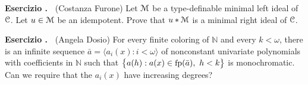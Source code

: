 \documentclass[10pt]{article}
\def\M{\EuScript M}
\def\C{\EuScript C}
\def\NN{\mathds N}
\newcounter{ex}
\newenvironment{exercise}{\bigskip\addtocounter{ex}{1}\textbf{Esercizio \theex.\ }}{}
\begin{document}
\begin{exercise} 
  (Costanza Furone)
  Let $\M$ be a type-definable minimal left ideal of $\C$.
  Let $u\in\M$ be an idempotent.
  Prove that $u*\M$ is a minimal right ideal of $\C$.
\end{exercise}

\begin{exercise}
  (Angela Dosio)
  For every finite coloring of $\NN$ and every $k<\omega$, 
  there is an infinite sequence $\bar a=\langle a_i(x):i<\omega\rangle$ of nonconstant univariate polynomials with coefficients in $\NN$ such that $\big\{a(h): a(x)\in{\rm fp}(\bar a),\ h<k\big\}$ is monochromatic.
  Can we require that the $a_i(x)$ have increasing degrees?
\end{exercise}
  
\end{document}
